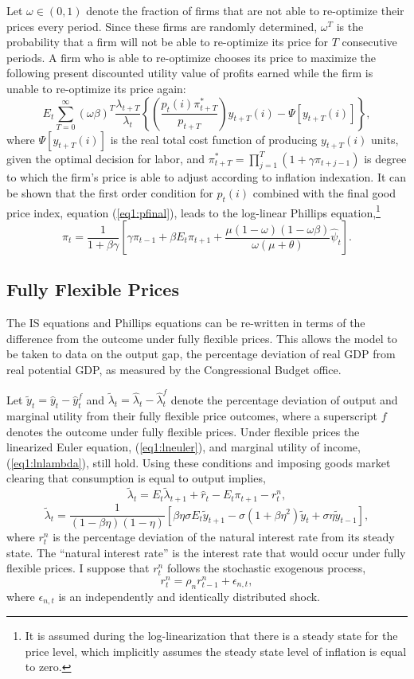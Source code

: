 \documentclass[11pt]{article}
\newcommand{\beq}{\begin{equation}}
\newcommand{\eeq}{\end{equation}}
\newcommand{\h}[1]{\hat{#1}}
\begin{document}
Let $\omega \in (0,1)$ denote the fraction of firms that are not able to re-optimize their prices every period.  Since these firms are randomly determined, $\omega^T$ is the probability that a firm will not be able to re-optimize its price for $T$ consecutive periods.  A firm who is able to re-optimize chooses its price to maximize the following present discounted utility value of profits earned while the firm is unable to re-optimize its price again: 
\beq \label{eq1:intprofit}
E_t \sum_{T=0}^{\infty} \left(\omega \beta \right)^{T} \frac{\lambda_{t+T}}{\lambda_t}
\left\{ \left(\frac{p_{t}(i) \pi_{t+T}^{*}}{p_{t+T}}\right) y_{t+T}(i) - \Psi\left[y_{t+T}(i)\right] \right\},
\eeq
where $\Psi\left[y_{t+T}(i)\right]$ is the real total cost function of producing $y_{t+T}(i)$ units, given the optimal decision for labor, and $\pi_{t+T}^{*} = \prod_{j=1}^{T} (1+\gamma \pi_{t+j-1})$ is degree to which the firm's price is able to adjust according to inflation indexation.  It can be shown that the first order condition for $p_{t}(i)$ combined with the final good price index, equation (\ref{eq1:pfinal}), leads to the log-linear Phillips equation,\footnote{It is assumed during the log-linearization that there is a steady state for the price level, which implicitly assumes the steady state level of inflation is equal to zero.}
\beq \label{eq1:phillips} \pi_t = \frac{1}{1+\beta \gamma} \left[ \gamma \pi_{t-1} + \beta E_t \pi_{t+1} + \frac{\mu (1-\omega)(1-\omega \beta)}{\omega (\mu + \theta)} \h{\psi}_t \right]. \eeq

\subsection{Fully Flexible Prices}
The IS equations and Phillips equations can be re-written in terms of the difference from the outcome under fully flexible prices.  This allows the model to be taken to data on the output gap, the percentage deviation of real GDP from real potential GDP, as measured by the Congressional Budget office.  

Let $\tilde{y}_t = \h{y}_t - \h{y}_t^f$ and $\tilde{\lambda}_t = \h{\lambda}_t - \h{\lambda}_t^f$ denote the percentage deviation of output and marginal utility from their fully flexible price outcomes, where a superscript $f$ denotes the outcome under fully flexible prices.  Under flexible prices the linearized Euler equation, (\ref{eq1:lneuler}), and marginal utility of income, (\ref{eq1:lnlambda}), still hold.  Using these conditions and imposing goods market clearing that consumption is equal to output implies,
\beq \label{eq1:gapeuler} \tilde{\lambda}_{t} = E_t \tilde{\lambda}_{t+1} + \h{r}_t - E_t \pi_{t+1} - r_t^n, \eeq
\beq \label{eq1:gaplambda} \tilde{\lambda}_t = \frac{1}{ (1-\beta \eta)(1-\eta)}\left[ \beta \eta \sigma E_t \tilde{y}_{t+1} - \sigma(1+\beta \eta^2) \tilde{y}_t + \sigma \eta \tilde{y}_{t-1} \right], \eeq
where $r_t^n$ is the percentage deviation of the natural interest rate from its steady state.  The ``natural interest rate'' is the interest rate that would occur under fully flexible prices.  I suppose that $r_t^n$ follows the stochastic exogenous process,
\beq \label{eq1:natint} r_t^n = \rho_n r_{t-1}^n + \epsilon_{n,t}, \eeq
where $\epsilon_{n,t}$ is an independently and identically distributed shock.
\end{document}
